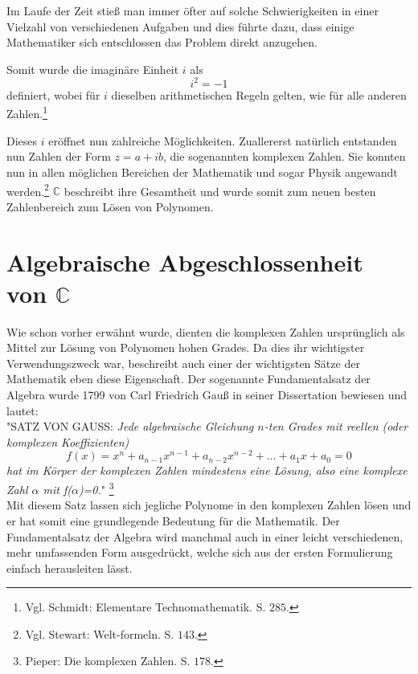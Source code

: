 \documentclass[a4paper,12pt]{article} %
\begin{document}
Im Laufe der Zeit stieß man immer öfter auf solche Schwierigkeiten in einer Vielzahl von verschiedenen Aufgaben und dies führte dazu, dass einige Mathematiker sich entschlossen das Problem direkt anzugehen.

Somit wurde die imaginäre Einheit $i$ als
\[i^2=-1\]
definiert, wobei für $i$ dieselben arithmetischen Regeln gelten, wie für alle anderen Zahlen.\footnote{Vgl. Schmidt: Elementare Technomathematik. S. $285$.}


Dieses $i$ eröffnet nun zahlreiche Möglichkeiten.
Zuallererst natürlich entstanden nun Zahlen der Form $z=a+ib$, die sogenannten komplexen Zahlen.
Sie konnten nun in allen möglichen Bereichen der Mathematik und sogar Physik angewandt werden.\footnote{Vgl. Stewart: Welt-formeln. S. $143$.}
$\mathbb{C}$ beschreibt ihre Gesamtheit und wurde somit zum neuen besten Zahlenbereich zum Lösen von Polynomen.


\section{Algebraische Abgeschlossenheit von $\mathbb{C}$}

Wie schon vorher erwähnt wurde, dienten die komplexen Zahlen ursprünglich als Mittel zur Lösung von Polynomen hohen Grades.
Da dies ihr wichtigster Verwendungszweck war, beschreibt auch einer der wichtigsten Sätze der Mathematik eben diese Eigenschaft.
Der sogenannte Fundamentalsatz der Algebra wurde 1799 von Carl Friedrich Gauß in seiner Dissertation bewiesen und lautet:\\

\noindent "\uppercase{Satz von Gauss:} \emph{Jede algebraische Gleichung $n$-ten Grades mit reellen (oder komplexen Koeffizienten)}
\begin{equation}\label{eq:funda}
		f(x)=x^n + a_{n-1}x^{n-1} + a_{n-2}x^{n-2} + \dots + a_1x + a_0 = 0
\end{equation} 
\noindent \emph{hat im Körper der komplexen Zahlen mindestens eine Lösung, also eine komplexe Zahl $\alpha$ mit f($\alpha$)=0.}"{} 
\footnote{Pieper: Die komplexen Zahlen. S. $178$.}\\

Mit diesem Satz lassen sich jegliche Polynome in den komplexen Zahlen lösen und er hat somit eine grundlegende Bedeutung für die Mathematik.
Der Fundamentalsatz der Algebra wird manchmal auch in einer leicht verschiedenen, mehr umfassenden Form ausgedrückt, welche sich aus der ersten Formulierung einfach herausleiten lässt.\\
\end{document}
